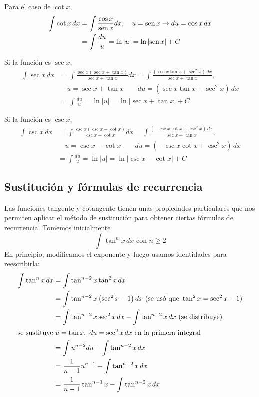 Para el caso de $\cot x$,
\begin{align*}
  \int \cot x\,dx&=\int \frac{\cos x}{\operatorname{sen} x}dx,\quad u=\operatorname{sen} x \rightarrow du=\cos x\,dx\\
  &=\int \frac{du}{u}=\ln \left\vert u\right\vert =\ln \left\vert \operatorname{sen}
  x\right\vert +C
\end{align*}

Si la función es $\sec x$,
\begin{align*}
  \int \sec x\,dx & =\int \frac{\sec x\left( \sec x+\tan x\right) }{\sec x+\tan x}dx =\int \frac{\left( \sec x\tan x+\sec ^{2}x\right)\,dx}{\sec x+\tan x},\\
  &\quad u=\sec x+\tan x\qquad du=\left( \sec x\tan x+\sec ^{2}x\right)\,dx\\
  &=\int \frac{du}{u}=\ln \left\vert u\right\vert =\ln \left\vert \sec x+\tan
  x\right\vert +C
\end{align*}

Si la función es $\csc x$,
\begin{align*}
  \int \csc x\,dx&=\int \frac{\csc x\left( \csc x-\cot x\right) }{\csc x-\cot x}dx=\int \frac{\left( -\csc x\cot x+\csc ^{2}x\right)\,dx}{\sec x+\tan x},\\
  &\quad u=\csc x-\cot x\qquad du=\left( -\csc x\cot x+\csc ^{2}x\right)\,dx\\
  &=\int \frac{du}{u}=\ln \left\vert u\right\vert =\ln \left\vert \csc x-\cot
  x\right\vert +C
\end{align*}

\subsection{Sustitución y fórmulas de recurrencia}

Las funciones tangente y cotangente tienen unas propiedades particulares que nos permiten aplicar el método de sustitución para obtener ciertas fórmulas de recurrencia. Tomemos inicialmente
\[
  \int \tan ^{n}x\,dx\text{ con $n\geq 2$}
\]
En principio, modificamos el exponente y luego usamos identidades para reescribirla:
\begin{gather*}
  \begin{aligned}
    \int \tan ^{n}x\,dx&=\int \tan ^{n-2}x\tan ^{2}x\,dx\\
    &=\int \tan ^{n-2}x\left( \sec ^{2}x-1\right) dx \ (\text{se usó que }\tan ^{2}x=\sec ^{2}x-1)\\
    &=\int \tan ^{n-2}x\sec ^{2}x\,dx-\int \tan ^{n-2}x\,dx\ (\text{se distribuye})\\
    \intertext{se sustituye $u=\tan x,\ du=\sec ^{2}x\,dx$ en la primera integral}
    &=\int u^{n-2}du-\int \tan ^{n-2}x\,dx\\
    &=\frac{1}{n-1}u^{n-1}-\int \tan^{n-2}x\,dx\\
    &=\frac{1}{n-1}\tan ^{n-1}x-\int \tan ^{n-2}x\,dx
  \end{aligned}
\end{gather*}


